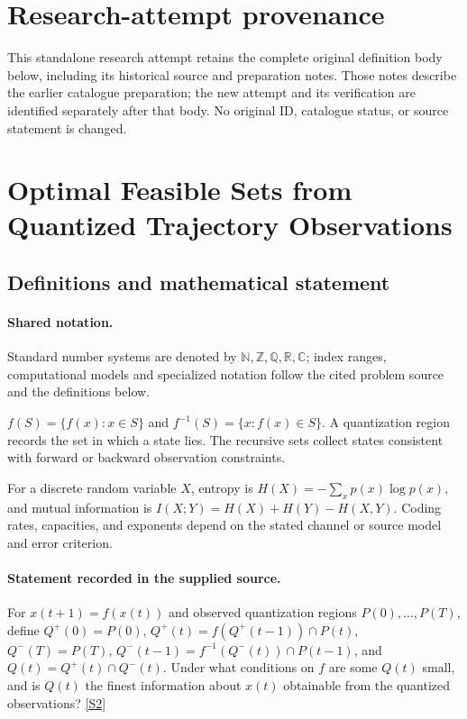 \documentclass[11pt]{article}
\begin{document}
\section*{Research-attempt provenance}
This standalone research attempt retains the complete original definition body below,
including its historical source and preparation notes. Those notes describe the
earlier catalogue preparation; the new attempt and its verification are identified
separately after that body. No original ID, catalogue status, or source statement is changed.

\section{Optimal Feasible Sets from Quantized Trajectory Observations}\label{statement}

\subsection{Definitions and mathematical statement}

\paragraph{Shared notation.}Standard number systems are denoted by $\mathbb N,\mathbb Z,\mathbb Q,\mathbb R,\mathbb C$; index ranges, computational models and specialized notation follow the cited problem source and the definitions below.


$f(S)=\{f(x):x\in S\}$ and $f^{-1}(S)=\{x:f(x)\in S\}$. A quantization region records the set in which a state lies. The recursive sets collect states consistent with forward or backward observation constraints.

For a discrete random variable $X$, entropy is $H(X)=-\sum_xp(x)\log p(x)$, and mutual information is $I(X;Y)=H(X)+H(Y)-H(X,Y)$. Coding rates, capacities, and exponents depend on the stated channel or source model and error criterion.
\paragraph{Statement recorded in the supplied source.}
For $x(t+1)=f(x(t))$ and observed quantization regions $P(0),\ldots,P(T)$, define $Q^+(0)=P(0)$, $Q^+(t)=f(Q^+(t-1))\cap P(t)$, $Q^-(T)=P(T)$, $Q^-(t-1)=f^{-1}(Q^-(t))\cap P(t-1)$, and $Q(t)=Q^+(t)\cap Q^-(t)$. Under what conditions on $f$ are some $Q(t)$ small, and is $Q(t)$ the finest information about $x(t)$ obtainable from the quantized observations? \href{https://doi.org/10.4171/owr/2009/11}{[S2]}
\end{document}
